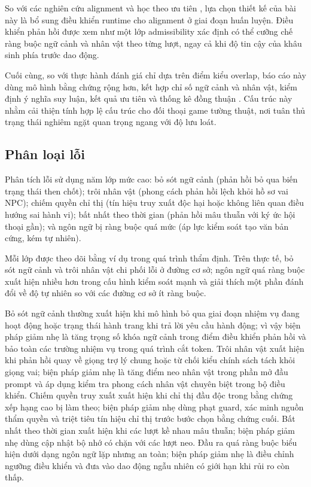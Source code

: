 ﻿\documentclass[a4paper,12pt]{article}
\begin{document}
So với các nghiên cứu alignment và học theo ưu tiên \cite{Ouyang2022InstructGPT,Rafailov2023DPO,Bai2022Constitutional}, lựa chọn thiết kế của bài này là bổ sung điều khiển runtime cho alignment ở giai đoạn huấn luyện. Điều khiển phản hồi được xem như một lớp admissibility xác định có thể cưỡng chế ràng buộc ngữ cảnh và nhân vật theo từng lượt, ngay cả khi độ tin cậy của khâu sinh phía trước dao động.

Cuối cùng, so với thực hành đánh giá chỉ dựa trên điểm kiểu overlap, báo cáo này dùng mô hình bằng chứng rộng hơn, kết hợp chỉ số ngữ cảnh và nhân vật, kiểm định ý nghĩa suy luận, kết quả ưu tiên và thống kê đồng thuận \cite{Zhang2020BERTScore,Zheng2023MTBench,Wang2024Judge,Dubois2024AlpacaEval,Cohen1960Kappa}. Cấu trúc này nhằm cải thiện tính hợp lệ cấu trúc cho đối thoại game tường thuật, nơi tuân thủ trạng thái nghiêm ngặt quan trọng ngang với độ lưu loát.

\subsection{Phân loại lỗi}
Phân tích lỗi sử dụng năm lớp mức cao: bỏ sót ngữ cảnh (phản hồi bỏ qua biến trạng thái then chốt); trôi nhân vật (phong cách phản hồi lệch khỏi hồ sơ vai NPC); chiếm quyền chỉ thị (tín hiệu truy xuất độc hại hoặc không liên quan điều hướng sai hành vi); bất nhất theo thời gian (phản hồi mâu thuẫn với ký ức hội thoại gần); và ngôn ngữ bị ràng buộc quá mức (áp lực kiểm soát tạo văn bản cứng, kém tự nhiên).

Mỗi lớp được theo dõi bằng ví dụ trong quá trình thẩm định. Trên thực tế, bỏ sót ngữ cảnh và trôi nhân vật chi phối lỗi ở đường cơ sở; ngôn ngữ quá ràng buộc xuất hiện nhiều hơn trong cấu hình kiểm soát mạnh và giải thích một phần đánh đổi về độ tự nhiên so với các đường cơ sở ít ràng buộc.

Bỏ sót ngữ cảnh thường xuất hiện khi mô hình bỏ qua giai đoạn nhiệm vụ đang hoạt động hoặc trạng thái hành trang khi trả lời yêu cầu hành động; vì vậy biện pháp giảm nhẹ là tăng trọng số khóa ngữ cảnh trong điểm điều khiển phản hồi và bảo toàn các trường nhiệm vụ trong quá trình cắt token. Trôi nhân vật xuất hiện khi phản hồi quay về giọng trợ lý chung hoặc từ chối kiểu chính sách tách khỏi giọng vai; biện pháp giảm nhẹ là tăng điểm neo nhân vật trong phần mở đầu prompt và áp dụng kiểm tra phong cách nhân vật chuyên biệt trong bộ điều khiển. Chiếm quyền truy xuất xuất hiện khi chỉ thị đầu độc trong bằng chứng xếp hạng cao bị làm theo; biện pháp giảm nhẹ dùng phạt guard, xác minh nguồn thẩm quyền và triệt tiêu tín hiệu chỉ thị trước bước chọn bằng chứng cuối. Bất nhất theo thời gian xuất hiện khi các lượt kề nhau mâu thuẫn; biện pháp giảm nhẹ dùng cập nhật bộ nhớ có chặn với các lượt neo. Đầu ra quá ràng buộc biểu hiện dưới dạng ngôn ngữ lặp nhưng an toàn; biện pháp giảm nhẹ là điều chỉnh ngưỡng điều khiển và đưa vào dao động ngẫu nhiên có giới hạn khi rủi ro còn thấp.
\end{document}

